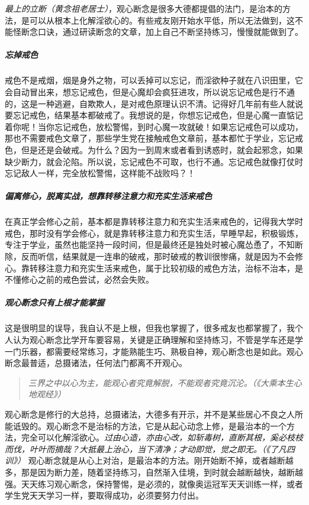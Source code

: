 \textit{最上的立断（黄念祖老居士）}，观心断念是很多大德都提倡的法门，是治本的方法，是可以从根本上化解淫欲心的。有些戒友刚开始水平低，所以无法做到，这不能怪断念口诀，通过研读断念的文章，加上自己不断坚持练习，慢慢就能做到了。

\subparagraph{忘掉戒色}

戒色不是戒烟，烟是身外之物，可以丢掉可以忘记，而淫欲种子就在八识田里，它会自动冒出来，想忘记戒色，但是心魔却会疯狂进攻，所以说忘记戒色是行不通的，这是一种逃避，自欺欺人，是对戒色原理认识不清。记得好几年前有些人就说要忘记戒色，结果基本都破戒了。我想说的是，你想忘记戒色，但是心魔一直惦记着你呢！当你忘记戒色，放松警惕，到时心魔一攻就破！如果忘记戒色可以成功，那也不需要戒色文章了，那些学生党在接触戒色文章前，基本都忙于学业，忘记戒色，但是还是会破戒。为什么？因为一到周末或者看到诱惑时，就会起邪念，如果缺少断力，就会沦陷。所以说，忘记戒色不可取，也行不通。忘记戒色就像打仗时忘记敌人一样，完全放松警惕，这样能不战败吗？！

\subparagraph{偏离修心，脱离实战，想靠转移注意力和充实生活来戒色}

在真正学会修心之前，基本都是靠转移注意力和充实生活来戒色的，记得我大学时戒色，那时没有学会修心，就是靠转移注意力和充实生活，早睡早起，积极锻炼，专注于学业，虽然也能坚持一段时间，但是最终还是独处时被心魔怂恿了，不知断除，反而听信，结果就是一连串的破戒，那时破戒的教训很惨痛，就是因为不会修心。靠转移注意力和充实生活来戒色，属于比较初级的戒色方法，治标不治本，是不懂修心之前的戒色尝试，必然会失败。

\subparagraph{观心断念只有上根才能掌握}

这是很明显的误导，我自认不是上根，但我也掌握了，很多戒友也都掌握了，我个人认为观心断念比学开车要容易，关键是正确理解和坚持练习，不管是学车还是学一门乐器，都需要经常练习，才能熟能生巧、熟极自神，观心断念也是如此。观心断念最普适，总摄诸法，任何法门都离不开观心。

\begin{quote}\it
    三界之中以心为主，能观心者究竟解脱，不能观者究竟沉沦。（《大乘本生心地观经》）
\end{quote}

观心断念是修行的大总持，总摄诸法，大德多有开示，并不是某些居心不良之人所能诋毁的。观心断念不是治标的方法，它是从起心动念上修，是最治本的一个方法，完全可以化解淫欲心。\textit{过由心造，亦由心改，如斩毒树，直断其根，奚必枝枝而伐，叶叶而摘哉？大抵最上治心，当下清净；才动即觉，觉之即无。（《了凡四训》）} 观心断念就是从心上对治，是最治本的方法。刚开始断不掉，或者越断越多，那是因为断力差，随着坚持练习，自然渐入佳境，到时就会越断越快，越断越强。天天练习观心断念，保持警惕，是必须的，就像奥运冠军天天训练一样，或者学生党天天学习一样，要取得成功，必须要努力付出。

